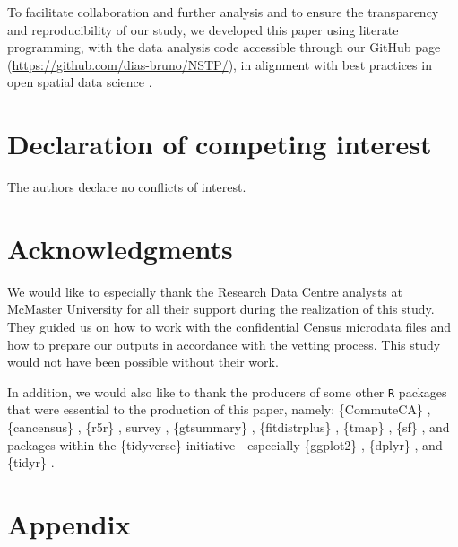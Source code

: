 \documentclass[preprint, 3p,
authoryear]{elsarticle} %
\begin{document}
To facilitate collaboration and further analysis and to ensure the
transparency and reproducibility of our study, we developed this paper
using literate programming, with the data analysis code accessible
through our GitHub page (\url{https://github.com/dias-bruno/NSTP/}), in
alignment with best practices in open spatial data science
\citep{páez2021, arribas-bel2021}.

\section*{Declaration of competing
interest}\label{declaration-of-competing-interest}

The authors declare no conflicts of interest.

\section*{Acknowledgments}\label{acknowledgments}

We would like to especially thank the Research Data Centre analysts at
McMaster University for all their support during the realization of this
study. They guided us on how to work with the confidential Census
microdata files and how to prepare our outputs in accordance with the
vetting process. This study would not have been possible without their
work.

In addition, we would also like to thank the producers of some other
\texttt{R} packages that were essential to the production of this paper,
namely: \{CommuteCA\} \citep{CommuteCA}, \{cancensus\}
\citep{cancensus}, \{r5r\} \citep{pereira2021a}, survey
\citep{lumley2011}, \{gtsummary\} \citep{gtsummary}, \{fitdistrplus\}
\citep{delignette2015fitdistrplus}, \{tmap\} \citep{tmap}, \{sf\}
\citep{sf}, and packages within the \{tidyverse\} initiative
\citep{tidyverse} - especially \{ggplot2\} \citep{ggplot2}, \{dplyr\}
\citep{dplyr}, and \{tidyr\} \citep{tidyr}.

\section*{Appendix}\label{appendix}

\renewcommand{\thetable}{A.1}
\end{document}
